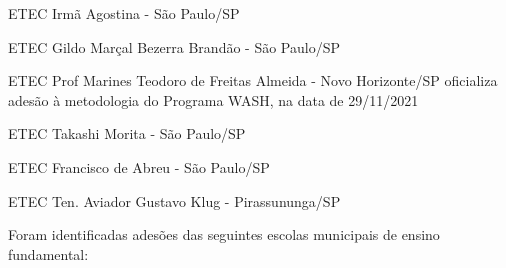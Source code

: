 \documentclass[
12pt,		%
openright,	%
twoside,  %
a4paper,			%
chapter=TITLE,		%
english,			%
french,				%
spanish,			%
brazil				%
]{USPSC-classe/USPSC}
\begin{document}
\begin{alineas}
\item ETEC Irm\~a Agostina - S\~ao Paulo/SP
\item ETEC Gildo Mar\c{c}al Bezerra Brand\~ao - S\~ao Paulo/SP
\item ETEC Prof Marines Teodoro de Freitas Almeida - Novo Horizonte/SP oficializa ades\~ao \`a metodologia do Programa WASH, na data de 29/11/2021
\item ETEC Takashi Morita - S\~ao Paulo/SP
\item ETEC Francisco de Abreu - S\~ao Paulo/SP
\item ETEC Ten. Aviador Gustavo Klug - Pirassununga/SP
\end{alineas}

Foram identificadas ades\~oes das seguintes escolas municipais de ensino fundamental:
\end{document}
